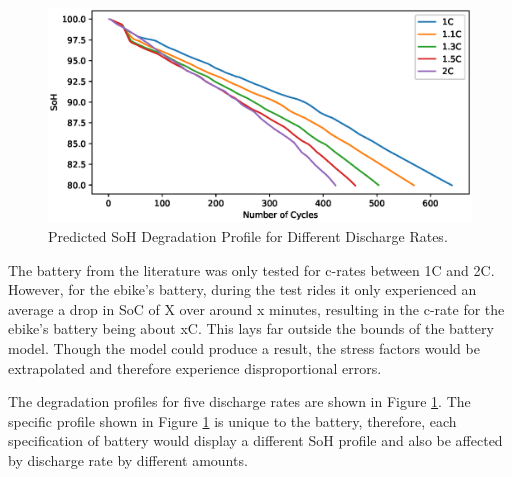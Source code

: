 \documentclass[a4paper, 10pt]{article}
\numberwithin{equation}{section}
\begin{document}
\begin{figure}[H]
    \centering
    \includegraphics[width=0.7\linewidth]{images/F3_SoH_C.eps}
    \caption{Predicted SoH Degradation Profile for Different Discharge Rates.}
    \label{fig:SoHC1}
\end{figure}
The battery from the literature was only tested for c-rates between 1C and 2C. However, for the ebike's battery, during the test rides it only experienced an average a drop in SoC of X over around x minutes, resulting in the c-rate for the ebike's battery being about xC. This lays far outside the bounds of the battery model. Though the model could produce a result, the stress factors would be extrapolated and therefore experience disproportional errors. 

The degradation profiles for five discharge rates are shown in Figure \ref{fig:SoHC1}. The specific profile shown in Figure \ref{fig:SoHC1} is unique to the battery, therefore, each specification of battery would display a different SoH profile and also be affected by discharge rate by different amounts.
\end{document}
